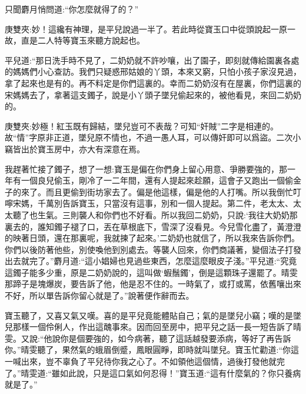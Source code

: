 \begin{parag}
    只聞麝月悄問道:“你怎麼就得了的？”\begin{note}庚雙夾:妙！這纔有神理，是平兒說過一半了。若此時從寶玉口中從頭說起一原一故，直是二人特等寶玉來聽方說起也。\end{note}平兒道:“那日洗手時不見了，二奶奶就不許吵嚷，出了園子，即刻就傳給園裏各處的媽媽們小心查訪。我們只疑惑邢姑娘的丫頭，本來又窮，只怕小孩子家沒見過，拿了起來也是有的。再不料定是你們這裏的。幸而二奶奶沒有在屋裏，你們這裏的宋媽媽去了，拿著這支鐲子，說是小丫頭子墜兒偷起來的，被他看見，來回二奶奶的。\begin{note}庚雙夾:妙極！紅玉既有歸結，墜兒豈可不表哉？可知“奸賊”二字是相連的。故“情”字原非正道，墜兒原不情也，不過一愚人耳，可以傳奸即可以爲盜。二次小竊皆出於寶玉房中，亦大有深意在焉。\end{note}我趕著忙接了鐲子，想了一想:寶玉是偏在你們身上留心用意、爭勝要強的，那一年有一個良兒偷玉，剛冷了一二年間，還有人提起來趁願，這會子又跑出一個偷金子的來了。而且更偷到街坊家去了。偏是他這樣，偏是他的人打嘴。所以我倒忙叮嚀宋媽，千萬別告訴寶玉，只當沒有這事，別和一個人提起。第二件，老太太、太太聽了也生氣。三則襲人和你們也不好看。所以我回二奶奶，只說:‘我往大奶奶那裏去的，誰知鐲子褪了口，丟在草根底下，雪深了沒看見。今兒雪化盡了，黃澄澄的映著日頭，還在那裏呢，我就揀了起來。’二奶奶也就信了，所以我來告訴你們。你們以後防著他些，別使喚他到別處去。等襲人回來，你們商議著，變個法子打發出去就完了。”麝月道:“這小娼婦也見過些東西，怎麼這麼眼皮子淺。”平兒道:“究竟這鐲子能多少重，原是二奶奶說的，這叫做‘蝦鬚鐲’，倒是這顆珠子還罷了。晴雯那蹄子是塊爆炭，要告訴了他，他是忍不住的。一時氣了，或打或罵，依舊嚷出來不好，所以單告訴你留心就是了。”說著便作辭而去。
\end{parag}


\begin{parag}
    寶玉聽了，又喜又氣又嘆。喜的是平兒竟能體貼自己；氣的是墜兒小竊；嘆的是墜兒那樣一個伶俐人，作出這醜事來。因而回至房中，把平兒之話一長一短告訴了晴雯。又說:“他說你是個要強的，如今病著，聽了這話越發要添病，等好了再告訴你。”晴雯聽了，果然氣的蛾眉倒蹙，鳳眼圓睜，即時就叫墜兒。寶玉忙勸道:“你這一喊出來，豈不辜負了平兒待你我之心了。不如領他這個情，過後打發他就完了。”晴雯道:“雖如此說，只是這口氣如何忍得！”寶玉道:“這有什麼氣的？你只養病就是了。”
\end{parag}


